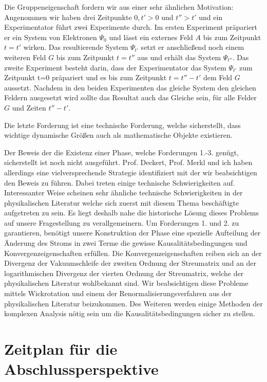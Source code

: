 \documentclass[a4paper,12pt]{article}
\begin{document}
Die Gruppeneigenschaft fordern wir aus einer sehr ähnlichen Motivation: Angenommen wir
haben drei Zeitpunkte \(0, t'>0\) und \(t''>t'\) und ein Experimentator führt zwei Experimente durch. Im ersten Experiment 
präpariert er ein System von Elektronen \(\Psi_0\) und lässt ein externes Feld \(A\) bis zum Zeitpunkt \(t=t'\) wirken. Das 
resultierende System \(\Psi_{t'}\) setzt er anschließend noch einem weiteren Feld \(G\) bis zum Zeitpunkt \(t=t''\) aus und
erhält das System \(\Psi_{t''}\). Das zweite Experiment besteht darin, dass der Experimentator das System \(\Psi_{t'}\) zum
Zeitpunkt t=0 präpariert und es bis zum Zeitpunkt \(t=t''-t'\) dem Feld \(G\) aussetzt. Nachdem in den beiden Experimenten
das gleiche System den gleichen Feldern ausgesetzt wird sollte das Resultat auch das Gleiche sein, für alle Felder \(G\)
und Zeiten \(t''-t'\). 

Die letzte Forderung ist eine technische Forderung, welche sicherstellt, dass wichtige dynamische Größen
auch als mathematische Objekte existieren.

Der Beweis der die Existenz einer Phase, welche Forderungen 1.-3. genügt, sicherstellt ist noch nicht 
ausgeführt. Prof. Deckert, Prof. Merkl und ich haben allerdings eine vielversprechende Strategie identifiziert mit der wir beabsichtigen
den Beweis zu führen. Dabei treten einige technische Schwierigkeiten auf. Interessanter Weise scheinen sehr ähnliche 
technische Schwierigkeiten in der physikalischen Literatur welche
sich zuerst mit diesem Thema beschäftigte aufgetreten zu sein. Es liegt deshalb nahe die historische Lösung dieses 
Problems auf unsere Fragestellung zu verallgemeinern. Um Forderungen 1. und 2. zu garantieren,
benötigt unsere Konstruktion der Phase eine
spezielle Aufteilung der Änderung des Stroms in zwei Terme die gewisse Kausalitätsbedingungen und 
Konvergenzeigenschaften erfüllen. Die Konvergenzeigenschaften reiben sich an der Divergenz der 
Vakuumschleife der zweiten Ordnung der Streumatrix und an der logarithmischen Divergenz der vierten Ordnung
der Streumatrix, welche der physikalischen Literatur wohlbekannt sind. Wir beabsichtigen diese Probleme 
mittels Wickrotation und einem der Renormalisierungsverfahren aus der physikalischen Literatur beizukommen. 
Des Weiteren werden einige Methoden der komplexen Analysis nötig sein um die Kausalitätsbedingungen sicher zu stellen.


\section{Zeitplan für die Abschlussperspektive}
\end{document}
